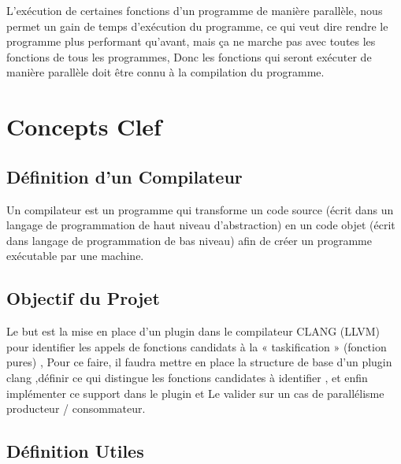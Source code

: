 \documentclass[12pt,titlepage]{article}
\begin{document}
 L’exécution de  certaines fonctions d'un programme de manière parallèle, nous permet un gain de temps d'exécution du programme, ce qui veut dire rendre le programme plus performant qu'avant, mais ça ne marche pas avec toutes  les fonctions de tous les programmes, Donc  les fonctions qui seront exécuter de manière parallèle doit être connu à la compilation du programme.

\section{Concepts Clef}

\subsection{Définition d'un Compilateur} 

Un compilateur est un programme qui transforme un code source (écrit dans un langage de programmation de haut niveau d'abstraction) en un code objet (écrit dans langage de programmation de bas niveau) afin de créer un programme exécutable par une machine.

\subsection{Objectif du Projet}

Le but est la mise en place d’un plugin dans le compilateur CLANG (LLVM) pour identifier les appels de fonctions candidats à la « taskification » (fonction pures) , Pour ce faire, il faudra mettre en place la structure de base d’un plugin clang ,définir ce qui distingue les fonctions candidates à identifier , et enfin implémenter ce support dans le plugin et  Le valider sur un cas de parallélisme producteur / consommateur.


\subsection{Définition Utiles}
\end{document}
